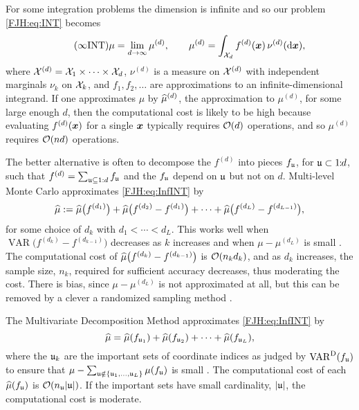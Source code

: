 \documentclass[graybox,footinfo]{svmult}
\DeclareMathOperator{\Var}{VAR}
\begin{document}
\begin{FJHLesson}
	\FJHLessonTwelve
\end{FJHLesson}

For some integration problems the dimension is infinite and so our problem \eqref{FJH:eq:INT} 
becomes
\begin{equation} \label{FJH:eq:InfINT} \tag{$\infty$INT}
\mu = \lim_{d \to \infty} \mu^{(d)}, \qquad \mu^{(d)} = \int_{\calX_d} f^{(d)}(\bsx) \, 
\nu^{(d)}(\D 
\bsx),
\end{equation} 
where ${\mathcal{X}}^{(d)} = {\mathcal{X}}_1 \times \cdots \times {\mathcal{X}}_d$, $\nu^{(d)}$ is a measure on 
${\mathcal{X}}^{(d)} $ 
with 
independent marginals $\nu_k$ on ${\mathcal{X}}_k$, and $f_1, f_2, \ldots$ are approximations to 
an 
infinite-dimensional integrand.  If one approximates $\mu$ by $\widehat{\mu}^{(d)}$, the 
approximation 
to 
$\mu^{(d)}$, for some large enough $d$, then the computational cost is likely to be high 
because evaluating $f^{(d)}({\boldsymbol{x}})$ for a single ${\boldsymbol{x}}$ typically requires ${\mathcal{O}}(d)$ 
operations, 
and so $\mu^{(d)}$ requires ${\mathcal{O}}(nd)$ operations.

The better alternative is often to decompose the $f^{(d)}$ into pieces $f_{\mathfrak{u}}$, for ${\mathfrak{u}} 
\subset 
1 \!\!:\!\! d$, such that $f^{(d)} = \sum_{{\mathfrak{u}} \subseteq 1:d} f_{{\mathfrak{u}}}$ and the 
$f_{\mathfrak{u}}$ depend on ${\mathfrak{u}}$ but not on $d$.  Multi-level Monte Carlo 
approximates \eqref{FJH:eq:InfINT} by
\begin{equation*}
\widehat{\mu} := \widehat{\mu}\bigl(f^{(d_1)}\bigr) + \widehat{\mu}\bigl(f^{(d_2)} - f^{(d_1)}\bigr) + 
\cdots + \widehat{\mu}\bigl(f^{(d_L)} - f^{(d_{L-1})}\bigr), 
\end{equation*}
for some choice of $d_k$ with $d_1 < \cdots < d_L$.  This works well when $\Var\bigl(f^{(d_k)} 
- f^{(d_{k-1} )} \bigr)$ decreases as $k$ increases and when $\mu - \mu^{(d_L)}$ is small \cite{
	Gil14a, Gil15a, Gil08b, Hei01a,  HicMGRitNiu09a, NiuHic09b}.  The computational cost of 
	$\widehat{\mu}\bigl(f^{(d_k)} - 
f^{(d_{k-1})} \bigr)$ is ${\mathcal{O}}(n_k d_k)$, and as $d_k$ increases, the sample size, $n_k$, 
required for sufficient accuracy decreases, thus moderating the cost.   There is bias, since 
$\mu - 
	\mu^{(d_L)}$ is not approximated at all, but this can be removed by a clever a randomized 
	sampling method \cite{RheGly12a}.
	
The Multivariate Decomposition Method approximates \eqref{FJH:eq:InfINT} by
\begin{equation*}
\widehat{\mu} = \widehat{\mu}(f_{{\mathfrak{u}}_1}) + \widehat{\mu}(f_{{\mathfrak{u}}_2}) + 
		\cdots +\widehat{\mu}(f_{{\mathfrak{u}}_L}),
\end{equation*} 
where the ${\mathfrak{u}}_k$ are the important sets of coordinate indices as judged by 
$\Var^{\Dt}(f_\fraku)$ to ensure that $\mu - \sum_{{\mathfrak{u}} \notin \{{\mathfrak{u}}_1,   \ldots, 
	{\mathfrak{u}}_L\}} \mu(f_{\mathfrak{u}})$ is small \cite{Was13b}.  The computational cost of each 
	$\widehat{\mu}(f_{{\mathfrak{u}}})$ 
is ${\mathcal{O}}(n_{\mathfrak{u}} \lvert {\mathfrak{u}} \rvert)$.  If the important sets have small cardinality, 
$\lvert {\mathfrak{u}} \rvert$, the computational cost is moderate.  
\end{document}
